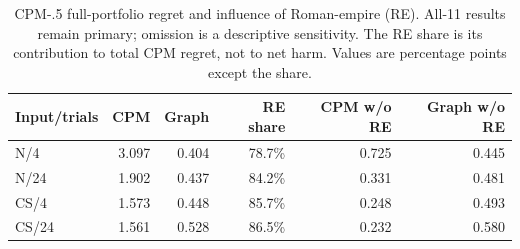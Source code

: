 \begin{table}[tbp]
\centering
\caption{CPM-.5 full-portfolio regret and influence of Roman-empire (RE). All-11 results remain primary; omission is a descriptive sensitivity. The RE share is its contribution to total CPM regret, not to net harm. Values are percentage points except the share.}
\label{tab:cpm_influence}
\small
\setlength{\tabcolsep}{3pt}
\begin{tabular}{@{}lrrrrr@{}}
\toprule
Input/trials & CPM & Graph & RE share & CPM w/o RE & Graph w/o RE \\
\midrule
N/4 & 3.097 & 0.404 & 78.7\% & 0.725 & 0.445 \\
N/24 & 1.902 & 0.437 & 84.2\% & 0.331 & 0.481 \\
CS/4 & 1.573 & 0.448 & 85.7\% & 0.248 & 0.493 \\
CS/24 & 1.561 & 0.528 & 86.5\% & 0.232 & 0.580 \\
\bottomrule
\end{tabular}
\end{table}
